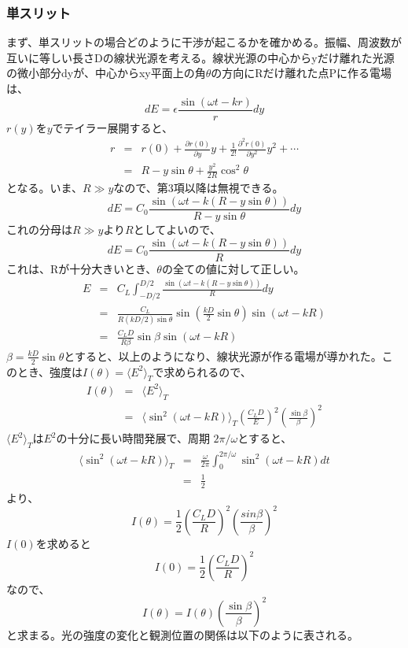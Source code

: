 \documentclass[uplatex,10pt,a4j]{jsarticle}
\begin{document}
\subsubsection{単スリット}
まず、単スリットの場合どのように干渉が起こるかを確かめる。振幅、周波数が互いに等しい長さDの線状光源を考える。線状光源の中心からyだけ離れた光源の微小部分dyが、中心からxy平面上の角$\theta$の方向にRだけ離れた点Pに作る電場は、
\[
  dE = \epsilon \frac{\sin(\omega t - kr)}{r} dy
\]
$r(y)$を$y$でテイラー展開すると、
\begin{eqnarray*}
  r &=&r(0) + \frac{\partial r(0)}{\partial y} y + \frac{1}{2!} \frac{\partial^2 r(0)}{\partial y^2} y^2 + \cdots \\
  &=&R - y\sin\theta + \frac{y^2}{2R} \cos^2 \theta
\end{eqnarray*}
となる。いま、$R \gg y$なので、第3項以降は無視できる。
\[
  dE = C_0 \frac{\sin(\omega t -k(R- y\sin \theta ))}{R- y \sin\theta} dy
\]
これの分母は$R \gg y$より$R$としてよいので、
\[
  dE = C_0 \frac{\sin(\omega t -k(R- y\sin \theta ))}{R} dy
\]
これは、Rが十分大きいとき、$\theta$の全ての値に対して正しい。
\begin{eqnarray*}
  E &=& C_L \int_{-D/2}^{D/2} \frac{\sin(\omega t - k( R - y\sin\theta ))}{R} dy \\
  &=& \frac{C_L}{R(kD/2)\sin\theta} \sin\left(\frac{kD}{2} \sin \theta \right) \sin(\omega t -kR) \\
  &=& \frac{C_L D}{R\beta} \sin \beta \sin(\omega t - kR)
\end{eqnarray*}
$\beta = \frac{kD}{2} \sin\theta$とすると、以上のようになり、線状光源が作る電場が導かれた。このとき、強度は$I(\theta) = \langle E^2\rangle_T$で求められるので、
\begin{eqnarray*}
  I(\theta) &=& \langle E^2 \rangle_T\\
  &=& \langle \sin^2(\omega t - kR)\rangle_T \left(\frac{C_L D}{E}\right)^2 \left(\frac{\sin\beta}{\beta}\right)^2
\end{eqnarray*}
$\langle E^2\rangle_T$は$E^2$の十分に長い時間発展で、周期 $2\pi / \omega$とすると、
\begin{eqnarray*}
  \langle \sin^2(\omega t - kR)\rangle_T  &=& \frac{\omega}{2\pi} \int_{0}^{2\pi / \omega} \sin^2(\omega t - kR) dt \\
  &=& \frac{1}{2}
\end{eqnarray*}
より、
\[
  I(\theta) = \frac{1}{2} \left(\frac{C_L D}{R}\right)^2 \left(\frac{sin \beta}{\beta}\right)^2
\]
$I(0)$を求めると
\[
  I(0) = \frac{1}{2} \left(\frac{C_L D}{R}\right)^2
\]
なので、
\[
  I(\theta) = I(\theta) \left(\frac{\sin \beta}{\beta}\right)^2
\]
と求まる。光の強度の変化と観測位置の関係は以下のように表される。\\
\end{document}
